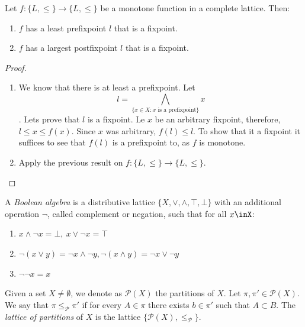 \begin{theorem}
  Let $f:\{L,\le\}\to \{L,\le\}$ be a monotone function in a complete lattice. Then:
  \begin{enumerate}
  \item $f$ has a least prefixpoint $l$ that is a fixpoint.
  \item $f$ has a largest postfixpoint $l$ that is a fixpoint.
  \end{enumerate}
\end{theorem}
\begin{proof}\\
  
  \begin{enumerate}
  \item We know that there is at least a prefixpoint. Let
    $$l = \bigwedge_{\{x\in X: x\text{ is a prefixpoint}\}} x $$. 
    Lets prove that $l$ is a fixpoint. Le $x$ be an arbitrary fixpoint, therefore, $l \le x \le f(x)$. Since $x$ was arbitrary, $f(l) \le l$. To show that it a fixpoint it suffices to see that $f(l)$ is a prefixpoint to, as $f$ is monotone.
  \item Apply the previous result on $f:\{L,\le\}\to \{L,\le\}$.
  \end{enumerate}
\end{proof}


\begin{definition}
  A \emph{Boolean algebra} is a distributive lattice  $\{X, \vee, \wedge, \top,\bot\}$ with an additional operation $\neg$, called complement or negation, such that for all $x\inX$:
  \begin{enumerate}
  \item $ x\wedge \neg x = \bot,\ x\vee \neg x = \top $
  \item $ \neg(x \vee y) = \neg x \wedge \neg y,  \neg(x \wedge y) = \neg x \vee \neg y$
  \item $\neg \neg x = x$
  \end{enumerate}
\end{definition}


\begin{definition}
Given a set $X\ne \emptyset$, we denote as $\mathcal{P}(X)$ the partitions of $X$. Let $\pi,\pi'\in \mathcal{P}(X)$. We say that $\pi\le_{\mathcal{P}}\pi'$ if for every $A\in \pi$ there exists $b\in \pi'$ such that $A\subset B$. The \emph{lattice of partitions} of $X$ is the lattice $\{\mathcal{P}(X),\le_{\mathcal{P}}\}$.
\end{definition}

